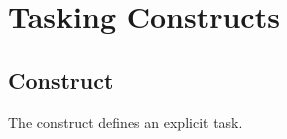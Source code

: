 %
%
%
%
%
%
%
%
%
%
%
%
%



\section{Tasking Constructs}
\label{sec:Tasking Constructs}
\subsection{ Construct}
\label{subsec:task Construct}
\summary
The  construct defines an explicit task.

